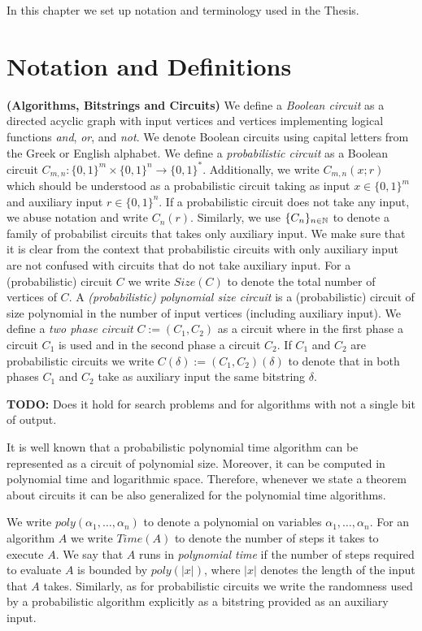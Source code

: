 In this chapter we set up notation and terminology used in the Thesis.
%
\section{Notation and Definitions}
\textbf{(Algorithms, Bitstrings and Circuits)}
We define a \textit{Boolean circuit} as a directed acyclic graph with input vertices and vertices implementing logical functions \textit{and}, \textit{or}, and \textit{not}.
We denote Boolean circuits using capital letters from the Greek or English alphabet.
We define a \textit{probabilistic circuit} as a Boolean circuit $C_{m,n} : \{0,1\}^{m} \times \{0,1\}^{n} \rightarrow \{0,1\}^{*}$.
Additionally, we write $C_{m,n}(x;r)$ which should be understood as a probabilistic circuit taking as input  $x \in \{0,1\}^{m}$
and auxiliary input $r \in \{0,1\}^{n}$.
If a probabilistic circuit does not take any input, we abuse notation and write $C_{n}(r)$.
Similarly, we use $\{C_n\}_{n \in \mathbb{N}}$ to denote a family of probabilist circuits that takes only auxiliary input.
We make sure that it is clear from the context that probabilistic circuits with only auxiliary input
are not confused with circuits that do not take auxiliary input.
For a (probabilistic) circuit $C$ we write $\mathit{Size}(C)$ to denote the total number of vertices of $C$.
A \textit{(probabilistic) polynomial size circuit} is a (probabilistic) circuit of size polynomial in the number of input vertices (including auxiliary input).
We define a \textit{two phase circuit} $C := (C_1, C_2)$ as a circuit where in the first phase a circuit $C_1$ is used and in the second phase a circuit $C_2$.
If $C_1$ and $C_2$ are probabilistic circuits we write $C(\delta) := (C_1, C_2)(\delta)$ to denote that in both phases $C_1$ and $C_2$ take
as auxiliary input the same bitstring $\delta$.

\begin{todo}
  \textbf{TODO:} Does it hold for search problems and for algorithms with not a single bit of output.
\end{todo}
It is well known \cite{Arora:2009:CCM:1540612} that a probabilistic polynomial time algorithm can be represented as a circuit of polynomial size.
Moreover, it can be computed in polynomial time and logarithmic space.
Therefore, whenever we state a theorem about circuits it can be also generalized for the polynomial time algorithms.

We write $\mathit{poly}(\alpha_1, \dots, \alpha_n)$ to denote a polynomial on variables $\alpha_1, \dots, \alpha_n$.
For an algorithm $A$ we write $\mathit{Time}(A)$ to denote the number of steps it takes to execute $A$.
We say that $A$ runs in \textit{polynomial time} if the number of steps required to evaluate $A$ is bounded by $poly(|x|)$, where $|x|$ denotes
the length of the input that $A$ takes.
Similarly, as for probabilistic circuits we write the randomness used by a probabilistic algorithm explicitly as a bitstring provided as an auxiliary input.

